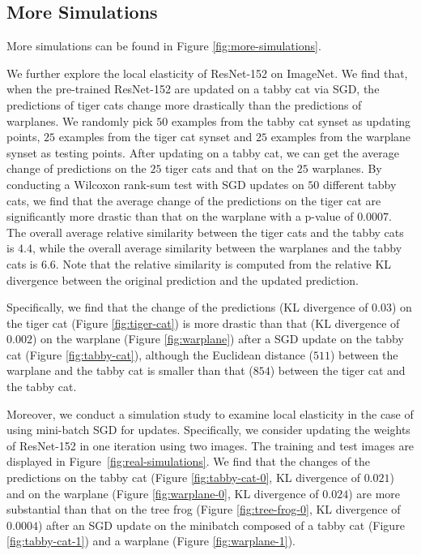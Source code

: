 \subsection{More Simulations} 
\label{subsec:more-simulations}
More simulations can be found in Figure \ref{fig:more-simulations}.


We further explore the local elasticity of ResNet-152 on ImageNet. We find that, when the pre-trained ResNet-152 are updated on a tabby cat via SGD, the predictions of tiger cats change more drastically than the predictions of warplanes. We randomly pick $50$ examples from the tabby cat synset as updating points, $25$ examples from the tiger cat synset and $25$ examples from the warplane synset as testing points. After updating on a tabby cat, we can get the average change of predictions on the $25$ tiger cats and that on the $25$ warplanes. By conducting a Wilcoxon rank-sum test with SGD updates on $50$ different tabby cats, we find that the average change of the predictions on the tiger cat are significantly more drastic than that on the warplane with a p-value of $0.0007$. The overall average relative similarity between the tiger cats and the tabby cats is $4.4$, while the overall average similarity between the  warplanes and the tabby cats is $6.6$. Note that the relative similarity is computed from the relative KL divergence between the original prediction and the updated prediction. 

Specifically, we find that the change of the predictions (KL divergence of $0.03$) on the tiger cat (Figure \ref{fig:tiger-cat}) is more drastic than that (KL divergence of $0.002$) on the warplane (Figure \ref{fig:warplane}) after a SGD update on the tabby cat (Figure \ref{fig:tabby-cat}), although the Euclidean distance ($511$) between the warplane and the tabby cat is smaller than that ($854$) between the tiger cat and the tabby cat.

Moreover, we conduct a simulation study to examine local elasticity in the case of using mini-batch SGD for updates. Specifically, we consider updating the weights of ResNet-152 in one iteration using two images. The training and test images are displayed in Figure~\ref{fig:real-simulations}. We find that the changes of the predictions on the tabby cat (Figure \ref{fig:tabby-cat-0}, KL divergence of $0.021$) and on the warplane (Figure \ref{fig:warplane-0}, KL divergence of $0.024$) are more substantial than that on the tree frog (Figure \ref{fig:tree-frog-0}, KL divergence of $0.0004$) after an SGD update on the minibatch composed of a tabby cat (Figure \ref{fig:tabby-cat-1}) and a warplane (Figure \ref{fig:warplane-1}).


